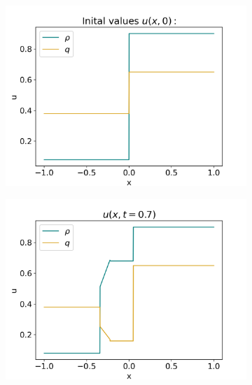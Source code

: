 \documentclass[10pt]{article}
\numberwithin{equation}{section}
\begin{document}
\begin{figure}[H]
     \centering
     \begin{subfigure}[t]{0.35\textwidth}
         \centering
         \includegraphics[width=\textwidth]{Figures/Model/Sys3bIV.png}
     \end{subfigure}
     \begin{subfigure}[t]{0.35\textwidth}
         \centering
         \includegraphics[width=\textwidth]{Figures/Model/Sys3bAtTime.png}
     \end{subfigure}
     \hfill 
     \begin{subfigure}[b]{0.35\textwidth}
         \centering

\end{subfigure}
\end{figure}
\end{document}
